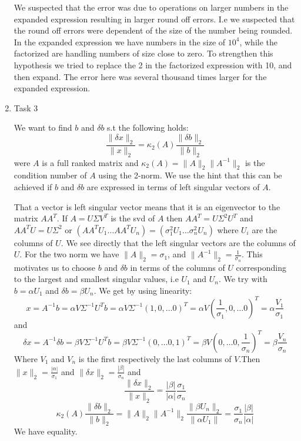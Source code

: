 \documentclass[a4paper]{article}
\begin{document}
\begin{enumerate}
We suspected that the error was due to operations on larger numbers in the expanded expression resulting in larger round off errors. I.e we suspected that the round off errors were dependent of the size of the number being rounded. In the expanded expression we have numbers in the size of $10^4$, while the factorized are handling numbers of size close to zero. To strengthen this hypothesis we tried to replace the 2 in the factorized expression with 10, and then expand. The error here was several thousand times larger for the expanded expression.

\item{Task 3}
 
We want to find $b$ and $\delta b$ s.t the following holds:
\begin{equation*}
\frac{\|\delta x\|_2}{\|x\|_2}=\kappa_2(A)\frac{\|\delta b\|_2}{\|b\|_2}
\end{equation*}
were $A$ is a full ranked matrix and $\kappa_2(A)=\|A\|_2\|A^{-1}\|_2$ is the condition number of $A$ using the 2-norm. We use the hint that this can be achieved if $b$ and $\delta b$ are expressed in terms of left singular vectors of $A$.

That a vector is left singular vector means that it is an eigenvector to the matrix $AA^T$. If $A=U\Sigma V^T$ is the svd of $A$ then $AA^T=U\Sigma^2U^T$ and $AA^TU = U\Sigma^2$ or $(AA^TU_1 \ldots AA^TU_n)=(\sigma_1^2U_1 \ldots \sigma_n^2U_n)$ where $U_i$ are the columns of $U$. We see directly that the left singular vectors are the columns of $U$. For the two norm we have $\|A\|_2 = \sigma_1$, and $\|A^{-1}\|_2=\frac{1}{\sigma_n}$. This motivates us to choose $b$ and $\delta b$ in terms of the columns of $U$ corresponding to the largest and smallest singular values, i.e $U_1$ and $U_n$. We try with $b = \alpha U_1$ and $\delta b = \beta U_n$. We get by using linearity:
\begin{equation*}
x = A^{-1}b = \alpha V\Sigma^{-1}U^Tb = \alpha V\Sigma^{-1}(1, 0, \ldots 0)^T = \alpha V(\frac{1}{\sigma_1}, 0, \ldots 0)^T = \alpha \frac{V_1}{\sigma_1}
\end{equation*} 
and 
\begin{equation*}
\delta x = A^{-1}\delta b = \beta V\Sigma^{-1}U^Tb = \beta V\Sigma^{-1}(0, \ldots 0, 1)^T = \beta V(0, \ldots 0, \frac{1}{\sigma_n})^T = \beta \frac{V_n}{\sigma_n}
\end{equation*}
Where $V_1$ and $V_n$ is the first respectively the last columns of $V$.Then $\|x\|_2 = \frac{|\alpha|}{\sigma_1}$ and $\|\delta x\|_2 = \frac{|\beta|}{\sigma_n}$ and  
\begin{equation*}
\frac{\|\delta x\|_2}{\|x\|_2}=\frac{|\beta|}{|\alpha|}\frac{\sigma_1}{\sigma_n}
\end{equation*}
\begin{equation*}
\kappa_2(A)\frac{\|\delta b\|_2}{\|b\|_2}=\|A\|_2\|A^{-1}\|_2\frac{\|\beta U_n\|_2}{\|\alpha U_1\|} =\frac{\sigma_1}{\sigma_n}\frac{|\beta|}{|\alpha|}
\end{equation*}
We have equality.


\end{enumerate}
\end{document}
